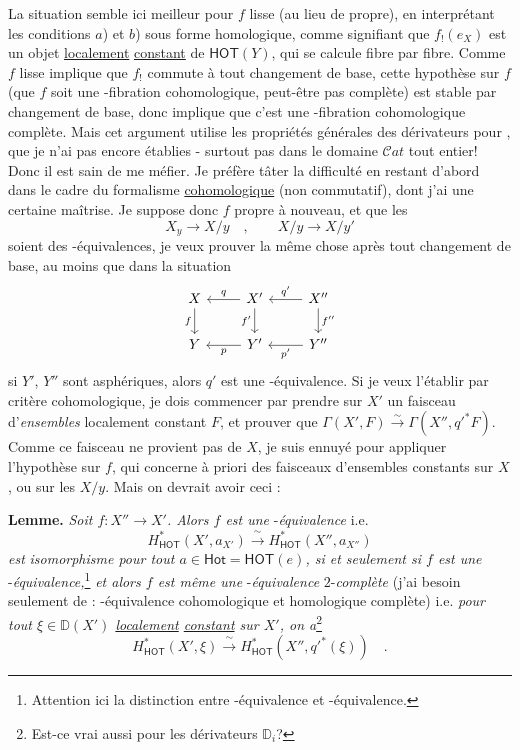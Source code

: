 \documentclass[11pt,leqno]{article}
\newcommand{\printedpage}[1]{\marginpar{\footnotesize p.~#1}}
\newcommand{\msp}[1]{\marginpar{\footnotesize [#1]}}
\newcommand{\DD}{\mathbb{D}}
\newcommand{\Hot}{\mathsf{Hot}}
\newcommand{\HOT}{\mathsf{HOT}}
\newcommand{\Cat}{\mathcal{C}at}
\begin{document}
La situation semble ici meilleur pour $f$ lisse (au lieu de propre), en interprétant les conditions $a$) et $b$) sous forme homologique, comme signifiant que $f_!(e_X)$ est un objet \underline{localement} \underline{constant} de $\mathsf{HOT}(Y)$, qui se calcule fibre par fibre. Comme $f$ lisse implique que $f_!$ commute à tout changement de base, cette hypothèse sur $f$ (que $f$ soit une \HOT-fibration cohomologique, peut-être pas complète) est stable par changement de base, donc implique que c'est une \HOT-fibration cohomologique complète. Mais cet argument utilise les propriétés générales des dérivateurs pour \HOT, que je n'ai pas encore établies - surtout pas dans le domaine $\Cat$ tout entier! Donc il est sain de me méfier. Je préfère tâter la difficulté en restant d'abord dans le cadre du formalisme \underline{cohomologique} (non commutatif), dont j'ai une certaine maîtrise. Je suppose donc $f$ propre à nouveau, et que les %
\[ X_y \longrightarrow X/y \quad , \qquad X/y \longrightarrow X/y' \]
\msp{page 109}
soient des \HOT-équivalences, je veux prouver la même chose après tout changement de base, au moins que dans la situation
\[
\begin{tikzcd}
X \arrow[r, leftarrow, "q"] \arrow[d, "f"'] & X' \arrow[r, leftarrow, "q'"] \arrow[d, "f'"'] & X'' \arrow[d, "f''"] \\
Y \arrow[r, leftarrow, "p"'] & Y' \arrow[r, leftarrow, "p'"'] & Y''
\end{tikzcd}
\]
\printedpage{65}
si $Y'$, $Y''$ sont asphériques, alors $q'$ est une \Hot-équivalence. Si je veux l'établir par critère cohomologique, je dois commencer par prendre sur $X'$ un faisceau d'\textit{ensembles} localement constant $F$, et prouver que $\Gamma(X',F) \overset{\sim}{\to} \Gamma(X'',{q'}^{*}F)$. Comme ce faisceau ne provient pas de $X$, je suis ennuyé pour appliquer l'hypothèse sur $f$, qui concerne à priori des faisceaux d'ensembles constants sur $X$, ou sur les $X/y$. Mais on devrait avoir ceci :

\textbf{Lemme.} \textit{Soit $f : X'' \to X'$. Alors $f$ est une} \HOT-\textit{équivalence} i.e.
\[ H^{*}_{}(X', a_{X'}) \xrightarrow{\ \sim\ } H^{*}_{\mathsf{HOT}}(X'', a_{X''}) \]
\textit{est} \textit{isomorphisme pour tout $a \in {} = \mathsf{HOT}(e)$, si et seulement si $f$ est une} \Hot-\textit{équivalence,}\footnote[56]{Attention ici la distinction entre \HOT-équivalence et \Hot-équivalence.} \textit{et alors $f$ est même une} \HOT-\textit{équivalence} $2$-\textit{complète} (j'ai besoin seulement de : \HOT-équivalence cohomologique et homologique complète) i.e. \textit{pour tout $\xi \in \DD(X')$ \underline{localement} \underline{constant} sur $X'$, on a}\footnote[57]{Est-ce vrai aussi pour les dérivateurs $\DD_i$?}
\[ H^{*}_{\mathsf{HOT}}(X',\xi) \xrightarrow{\ \sim\ } H^{*}_{\mathsf{HOT}}(X'',{q'}^{*}(\xi)) \quad . \]
\msp{page 110}
\end{document}
